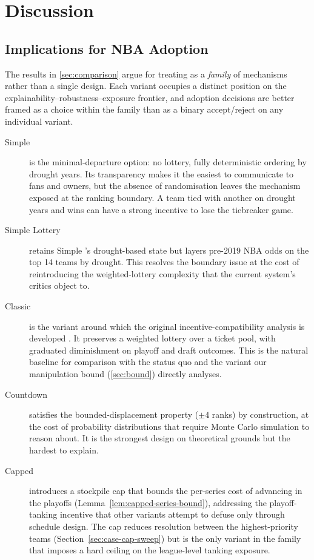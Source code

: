 \section{Discussion}
\label{sec:discussion}


\subsection{Implications for NBA Adoption}
\label{sec:adoption}

The results in \cref{sec:comparison} argue for treating \cola{} as a \emph{family} of mechanisms rather than a single design. Each variant occupies a distinct position on the explainability--robustness--exposure frontier, and adoption decisions are better framed as a choice within the family than as a binary accept/reject on any individual variant.

\begin{description}
    \item[Simple \cola{}] is the minimal-departure option: no lottery, fully deterministic ordering by drought years. Its transparency makes it the easiest to communicate to fans and owners, but the absence of randomisation leaves the mechanism exposed at the ranking boundary. A team tied with another on drought years and wins can have a strong incentive to lose the tiebreaker game.
    \item[Simple Lottery \cola{}] retains Simple \cola{}'s drought-based state but layers pre-2019 NBA odds on the top 14 teams by drought. This resolves the boundary issue at the cost of reintroducing the weighted-lottery complexity that the current system's critics object to.
    \item[Classic \cola{}] is the variant around which the original incentive-compatibility analysis is developed \citep{highley2026cola}. It preserves a weighted lottery over a ticket pool, with graduated diminishment on playoff and draft outcomes. This is the natural baseline for comparison with the status quo and the variant our manipulation bound (\cref{sec:bound}) directly analyses.
    \item[Countdown \cola{}] satisfies the bounded-displacement property ($\pm 4$ ranks) by construction, at the cost of probability distributions that require Monte Carlo simulation to reason about. It is the strongest design on theoretical grounds but the hardest to explain.
    \item[Capped \cola{}] introduces a stockpile cap that bounds the per-series cost of advancing in the playoffs (Lemma~\ref{lem:capped-series-bound}), addressing the playoff-tanking incentive that other variants attempt to defuse only through schedule design. The cap reduces resolution between the highest-priority teams (Section~\ref{sec:case-cap-sweep}) but is the only variant in the family that imposes a hard ceiling on the league-level tanking exposure.
\end{description}

